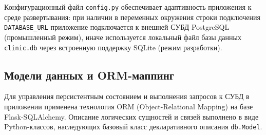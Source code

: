Конфигурационный файл \texttt{config.py} обеспечивает адаптивность приложения к среде развертывания: при наличии в переменных окружения строки подключения \texttt{DATABASE\_URL} приложение подключается к внешней СУБД PostgreSQL (промышленный режим), иначе используется локальный файл базы данных \texttt{clinic.db} через встроенную поддержку SQLite (режим разработки).

\subsection{Модели данных и ORM-маппинг}

Для управления персистентным состоянием и выполнения запросов к СУБД в приложении применена технология ORM (Object-Relational Mapping) на базе Flask-SQLAlchemy. Описание логических сущностей и связей выполнено в виде Python-классов, наследующих базовый класс декларативного описания \texttt{db.Model}.

